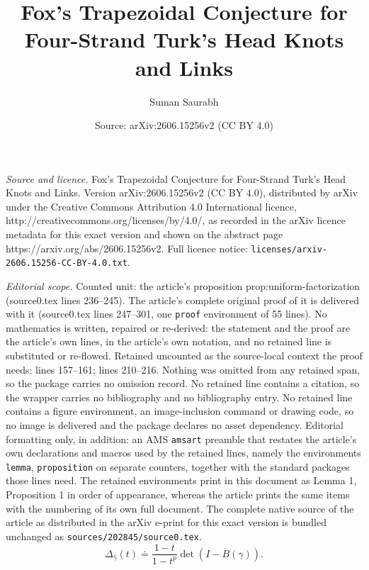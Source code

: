 \documentclass[10pt,a4paper]{amsart}
\title{Fox's Trapezoidal Conjecture for Four-Strand Turk's Head Knots and Links}
\author{Suman Saurabh}
\date{Source: arXiv:2606.15256v2 (CC BY 4.0)}
\newcommand{\Bur}{\overline B}
\newcommand{\dd}{\doteq}
\begin{document}
\maketitle

\noindent\emph{Source and licence.} Fox's Trapezoidal Conjecture for Four-Strand Turk's Head Knots and Links. Version arXiv:2606.15256v2 (CC BY 4.0), distributed by arXiv under the Creative Commons Attribution 4.0 International licence, http://creativecommons.org/licenses/by/4.0/, as recorded in the arXiv licence metadata for this exact version and shown on the abstract page https://arxiv.org/abs/2606.15256v2. Full licence notice: \texttt{licenses/arxiv-2606.15256-CC-BY-4.0.txt}.\par\smallskip

\noindent\textit{Editorial scope.} Counted unit: the article's proposition prop:uniform-factorization (source0.tex lines 236--245). The article's complete original proof of it is delivered with it (source0.tex lines 247--301, one \texttt{proof} environment of 55 lines). No mathematics is written, repaired or re-derived: the statement and the proof are the article's own lines, in the article's own notation, and no retained line is substituted or re-flowed.  Retained uncounted as the source-local context the proof needs: lines 157--161; lines 210--216.  Nothing was omitted from any retained span, so the package carries no omission record.  No retained line contains a citation, so the wrapper carries no bibliography and no bibliography entry.  No retained line contains a figure environment, an image-inclusion command or drawing code, so no image is delivered and the package declares no asset dependency.  Editorial formatting only, in addition: an AMS \texttt{amsart} preamble that restates the article's own declarations and macros used by the retained lines, namely the environments \texttt{lemma}, \texttt{proposition} on separate counters, together with the standard packages those lines need.  The retained environments print in this document as Lemma 1, Proposition 1 in order of appearance, whereas the article prints the same items with the numbering of its own full document.  The complete native source of the article as distributed in the arXiv e-print for this exact version is bundled unchanged as \texttt{sources/202845/source0.tex}.
\begin{equation}\label{eq:burau-formula-general}
        \Delta_{\widehat{\gamma}}(t)
        \dd
        \frac{1-t}{1-t^p}\det\left(I-\Bur(\gamma)\right).
\end{equation}
\end{document}
